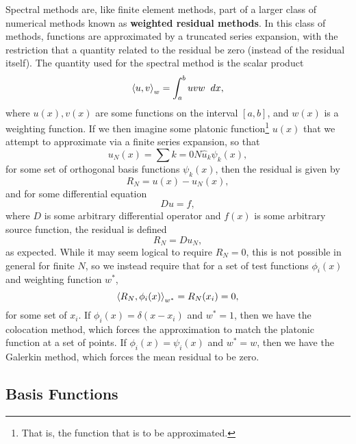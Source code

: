 Spectral methods are, like finite element methods, part of a larger class of numerical methods known as {\bf weighted residual methods}. In this class of methods, functions are approximated by a truncated series expansion, with the restriction that a quantity related to the residual be zero (instead of the residual itself). The quantity used for the spectral method is the scalar product 
\begin{equation}\label{eq:scalarProduct}
\scprod{u}{v}{w} = \int{a}{b}{uvw}{dx},
\end{equation}
where  $u(x),v(x)$ are some functions on the interval $[a,b]$, and $w(x)$ is a weighting function. If we then imagine some platonic function\footnote{That is, the function that is to be approximated.} $u(x)$ that we attempt to approximate via a finite series expansion, so that
\begin{equation}\label{eq:seriesExpansion}
u_N(x) = \sum{k=0}{N}{\hat{u}_k \psi_k(x)},
\end{equation}
for some set of orthogonal basis functions $\psi_k(x)$, then the residual is given by
\begin{equation}
R_N = u(x)-u_N(x),
\end{equation} 
and for some differential equation
\begin{equation}
Du = f,
\end{equation}
where $D$ is some arbitrary differential operator and $f(x)$ is some arbitrary source function, the residual is defined
\begin{equation}
R_N = Du_N,
\end{equation}
as expected. While it may seem logical to require $R_N = 0$, this is not possible in general for finite $N$, so we instead require that for a set of test functions $\phi_i(x)$ and weighting function $w^*$, 
\begin{equation}\label{eq:SpectralZero}
\left < R_N,\phi_i(x) \right >_{w^*} = R_N(x_i) = 0,
\end{equation}
for some set of $x_i$. If $\phi_i(x) = \delta(x-x_i)$ and $w^* = 1$, then we have the colocation method, which forces the approximation to match the platonic function at a set of points. If $\phi_i(x) = \psi_i(x)$ and $w^* = w$, then we have the Galerkin method, which forces the mean residual to be zero. 

\subsection{Basis Functions}

